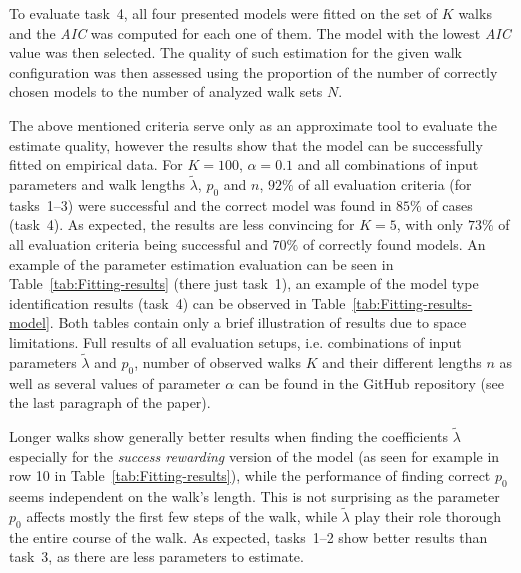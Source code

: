 \documentclass{amsart}
\theoremstyle{definition}
\theoremstyle{plain}
\theoremstyle{plain}
\theoremstyle{plain}
\numberwithin{equation}{section}
\begin{document}
    To evaluate task~4, all four presented models were fitted on the set of $K$ walks and the \emph{AIC} was computed for each one of them.
    The model with the lowest \emph{AIC} value was then selected.
    The quality of such estimation for the given walk configuration was then assessed using the proportion of the number of correctly chosen models to the number of analyzed walk sets $N$.

    The above mentioned criteria serve only as an approximate tool to evaluate the estimate quality, however the results show that the model can be successfully fitted on empirical data.
    For $K=100$, $\alpha=0.1$ and all combinations of input parameters and walk lengths $\tilde{\lambda}$, $p_0$ and $n$, $92\%$ of all evaluation criteria (for tasks~1--3) were successful and the correct model was found in $85\%$ of cases (task~4).
    As expected, the results are less convincing for $K=5$, with only $73\%$ of all evaluation criteria being successful and $70\%$ of correctly found models.
    An example of the parameter estimation evaluation can be seen in Table~\ref{tab:Fitting-results} (there just task~1), an example of the model type identification results (task~4) can be observed in Table~\ref{tab:Fitting-results-model}.
    Both tables contain only a brief illustration of results due to space limitations.
    Full results of all evaluation setups, i.e. combinations of input parameters $\tilde{\lambda}$ and $p_0$, number of observed walks $K$ and their different lengths $n$ as well as several values of parameter $\alpha$ can be found in the GitHub repository (see the last paragraph of the paper).

    Longer walks show generally better results when finding the coefficients $\tilde{\lambda}$ especially for the \emph{success rewarding} version of the model (as seen for example in row 10 in Table~\ref{tab:Fitting-results}), while the performance of finding correct $p_0$ seems independent on the walk's length.
    This is not surprising as the parameter $p_0$ affects mostly the first few steps of the walk, while $\tilde{\lambda}$ play their role thorough the entire course of the walk.
    As expected, tasks~1--2 show better results than task~3, as there are less parameters to estimate.
\end{document}
